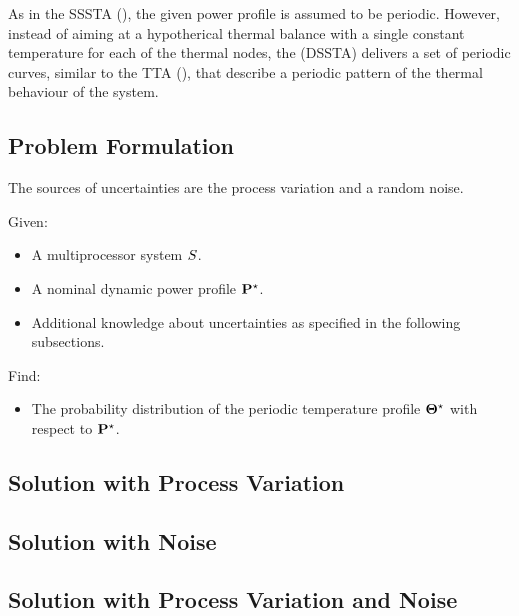 As in the SSSTA (), the given power profile is assumed to be periodic. However, instead of aiming at a hypotherical thermal balance with a single constant temperature for each of the thermal nodes, the  (DSSTA) delivers a set of periodic curves, similar to the TTA (), that describe a periodic pattern of the thermal behaviour of the system.

\subsection{Problem Formulation}
The sources of uncertainties are the process variation and a random noise.

Given:
\begin{itemize}
  \item A multiprocessor system $S$.
  \item A nominal dynamic power profile $\mathbf{P}^\star$.
  \item Additional knowledge about uncertainties as specified in the following subsections.
\end{itemize}

Find:
\begin{itemize}
  \item The probability distribution of the periodic temperature profile $\mathbf{\Theta}^\star$ with respect to $\mathbf{P}^\star$.
\end{itemize}

\subsection{Solution with Process Variation} 


\subsection{Solution with Noise} 


\subsection{Solution with Process Variation and Noise} 

